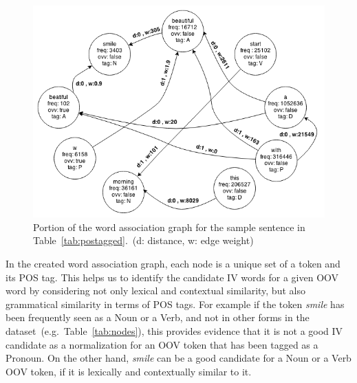\documentclass[a4paper,onesided,12pt]{report}
\begin{document}
\begin{figure}[htb]
\begin{center}
\includegraphics[scale=0.7]{fig/graph}
\caption{Portion of the word association graph for the sample sentence in Table~\ref{tab:postagged}.~(d: distance, w: edge weight)}
\label{fig:graph}
\end{center}
\end{figure}



In the created word association graph, each node is a unique set of a token and its POS tag. This helps us to identify the candidate IV words for a given OOV word by considering not only lexical and contextual similarity, but also grammatical similarity in terms of POS tags. For example if the token \textit{smile} has been frequently seen as a Noun or a Verb, and not in other forms in the dataset~(e.g.~Table~\ref{tab:nodes}), this provides evidence that it is not a good IV candidate as a normalization for an OOV token that has  been tagged as a Pronoun. On the other hand, \textit{smile} can be a good candidate for a Noun or a Verb OOV token, if it is lexically and contextually similar to it.
\end{document}

